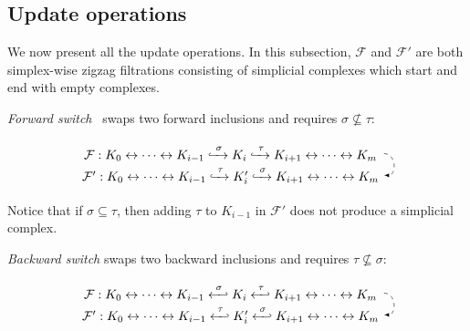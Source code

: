 \documentclass[letterpaper,11pt]{article}
\theoremstyle{mythmstyle}
\theoremstyle{mydefstyle}
\theoremstyle{plain}
\theoremstyle{definition}
\newcommand{\<}[1]{\langle #1\rangle}
\newcommand{\lbarrowspace}{\;}
\newcommand{\inctosp}[1]{\xhookrightarrow{\lbarrowspace#1\lbarrowspace}}
\newcommand{\bakinctosp}[1]{\xhookleftarrow{\lbarrowspace#1\lbarrowspace}}
\newcommand{\Fcal}{\mathcal{F}}
\newcommand{\sG}{\sigma}
\newcommand{\tG}{\tau}
\newcommand{\filtcnt}{m}
\begin{document}
\subsection{Update operations}
\label{sec:update-oper}

We now present all the update operations.
In this subsection, $\Fcal$ and $\Fcal'$  are both 
simplex-wise
zigzag filtrations consisting of simplicial complexes
which start and end with empty complexes.

\medskip
\noindent
\textit{{Forward switch}}~\cite{maria2014zigzag}
swaps two forward inclusions and
requires $\sG\nsubseteq\tG$:

\vspace{-0.5em}
\begin{equation}
\label{eqn:fwd-sw}
\begin{tikzpicture}[baseline=(current  bounding  box.center)]
\tikzstyle{every node}=[minimum width=24em]
\node (a) at (0,0) {$\Fcal:K_0 \leftrightarrow\cdots\leftrightarrow K_{i-1}\inctosp{\sG}K_i\inctosp{\tG}K_{i+1}\leftrightarrow\cdots\leftrightarrow K_\filtcnt$}; 
\node (b) at (0,-0.6){$\Fcal':K_0\leftrightarrow\cdots\leftrightarrow K_{i-1}\inctosp{\tG} K'_i\inctosp{\sG} K_{i+1}\leftrightarrow\cdots\leftrightarrow K_\filtcnt$};
\path[->] (a.0) edge [bend left=90,looseness=1.5,arrows={-latex},dashed] (b.0);
\end{tikzpicture}
\end{equation}

\noindent
Notice that if $\sG\subseteq\tG$, then adding $\tG$ to $K_{i-1}$ in $\Fcal'$
does not produce a simplicial complex.

\medskip
\noindent
\textit{{Backward switch}}
swaps two backward inclusions and
requires $\tG\nsubseteq\sG$:

\vspace{-0.5em}
\begin{equation}
\label{eqn:bak-sw}
\begin{tikzpicture}[baseline=(current  bounding  box.center)]
\tikzstyle{every node}=[minimum width=24em]
\node (a) at (0,0) {$\Fcal: K_0 \leftrightarrow
\cdots
\leftrightarrow 
K_{i-1}\bakinctosp{\sG} 
K_i 
\bakinctosp{\tG} K_{i+1}
\leftrightarrow
\cdots \leftrightarrow K_\filtcnt$}; 
\node (b) at (0,-0.6){$\Fcal': K_0 \leftrightarrow
\cdots
\leftrightarrow 
K_{i-1}\bakinctosp{\tG} 
K'_i 
\bakinctosp{\sG} K_{i+1}
\leftrightarrow
\cdots \leftrightarrow K_\filtcnt$};
\path[->] (a.0) edge [bend left=90,looseness=1.5,arrows={-latex},dashed] (b.0);
\end{tikzpicture}
\end{equation}
\end{document}
